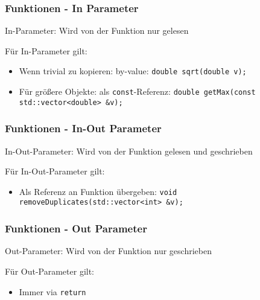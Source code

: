 \documentclass[aspectratio=169]{beamer}
\begin{document}
\begin{frame}
    \frametitle{Funktionen - In Parameter}
    {\Large In-Parameter: Wird von der Funktion nur gelesen}

    \vspace{1cm}

    \pause
    Für In-Parameter gilt:
    \begin{itemize}
        \item Wenn trivial zu kopieren: by-value:
            \lstinline{double sqrt(double v);}
            \pause
        \item Für größere Objekte: als \lstinline{const}-Referenz:
            \lstinline{double getMax(const std::vector<double> &v);}
    \end{itemize}
\end{frame}

\begin{frame}
    \frametitle{Funktionen - In-Out Parameter}
    {\Large In-Out-Parameter: Wird von der Funktion gelesen und geschrieben}

    \vspace{1cm}

    \pause
    Für In-Out-Parameter gilt:
    \begin{itemize} 
        \item Als Referenz an Funktion übergeben:
            \lstinline{void removeDuplicates(std::vector<int> &v);}
    \end{itemize}
\end{frame}

\begin{frame}
    \frametitle{Funktionen - Out Parameter}
    {\Large Out-Parameter: Wird von der Funktion nur geschrieben}

    \vspace{1cm}

    \pause
    Für Out-Parameter gilt:
    \begin{itemize}
        \item Immer via \lstinline{return}
    \end{itemize}
\end{frame} 
\end{document}
